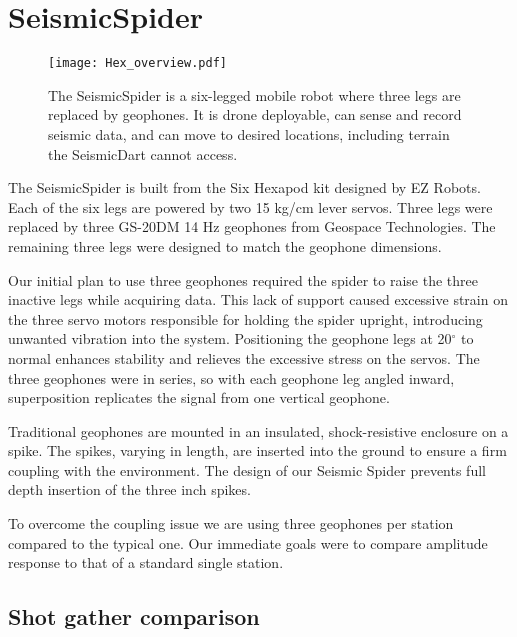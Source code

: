 \section{SeismicSpider}\label{sec:SeismicSpider}


\begin{figure} \centering
  {\texttt{[image: Hex\_overview.pdf]}}
 \caption{The SeismicSpider is a six-legged mobile robot where three legs are replaced by geophones. It is drone deployable, can sense and record seismic data, and can move to desired locations, including terrain the SeismicDart cannot access.} 
 \label{fig:TradvsAutoDrop}
\end{figure}


The SeismicSpider is built from the Six Hexapod kit designed by EZ Robots. Each of the six legs are powered by two 15 kg/cm lever servos. Three legs were replaced by three GS-20DM 14 Hz geophones from Geospace Technologies. The remaining three legs were designed to match the geophone dimensions.

 Our initial plan to use three geophones required the spider to raise the three inactive legs while acquiring data. This lack of support caused excessive strain on the three servo motors responsible for holding the spider upright, introducing unwanted vibration into the system.  Positioning the geophone legs at 20$^\circ$ to normal enhances stability and relieves the excessive stress on the servos. 
 The three geophones were in series, so with each geophone leg angled inward, superposition replicates the signal from one vertical geophone.
 
 Traditional geophones are mounted in an insulated, shock-resistive enclosure on a spike. The spikes, varying in length, are inserted into the ground to ensure a firm coupling with the environment. The design of our Seismic Spider prevents full depth insertion of the three inch spikes. 

	To overcome the coupling issue we are using three geophones per station compared to the typical one. Our immediate goals were to compare amplitude response to that of a standard single station.	
 

\subsection{Shot gather comparison}

